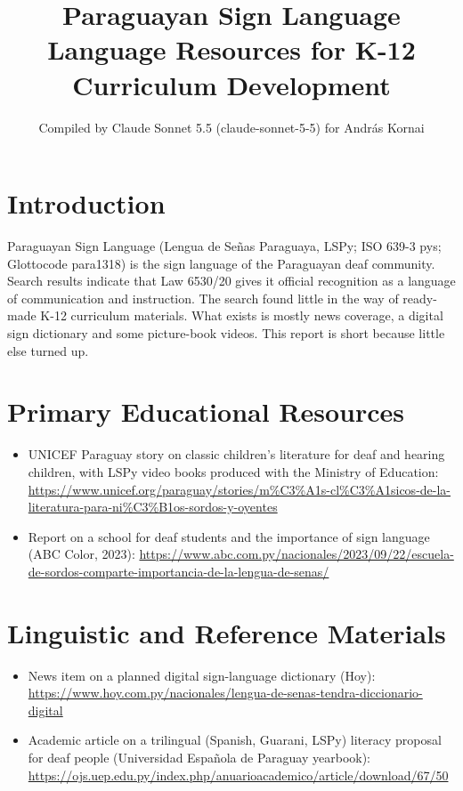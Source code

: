 \documentclass[12pt]{article}
\title{Paraguayan Sign Language Language Resources for K-12 Curriculum Development}
\author{Compiled by Claude Sonnet 5.5 (claude-sonnet-5-5) for Andr\'as Kornai}
\date{}
\begin{document}
\maketitle

\section{Introduction}
Paraguayan Sign Language (Lengua de Se\~nas Paraguaya, LSPy; ISO 639-3 pys; Glottocode para1318) is the sign language of the Paraguayan deaf community. Search results indicate that Law 6530/20 gives it official recognition as a language of communication and instruction. The search found little in the way of ready-made K-12 curriculum materials. What exists is mostly news coverage, a digital sign dictionary and some picture-book videos. This report is short because little else turned up.

\section{Primary Educational Resources}
\begin{itemize}
\item UNICEF Paraguay story on classic children's literature for deaf and hearing children, with LSPy video books produced with the Ministry of Education: \url{https://www.unicef.org/paraguay/stories/m%C3%A1s-cl%C3%A1sicos-de-la-literatura-para-ni%C3%B1os-sordos-y-oyentes}
\item Report on a school for deaf students and the importance of sign language (ABC Color, 2023): \url{https://www.abc.com.py/nacionales/2023/09/22/escuela-de-sordos-comparte-importancia-de-la-lengua-de-senas/}
\end{itemize}

\section{Linguistic and Reference Materials}
\begin{itemize}
\item News item on a planned digital sign-language dictionary (Hoy): \url{https://www.hoy.com.py/nacionales/lengua-de-senas-tendra-diccionario-digital}
\item Academic article on a trilingual (Spanish, Guarani, LSPy) literacy proposal for deaf people (Universidad Espa\~nola de Paraguay yearbook): \url{https://ojs.uep.edu.py/index.php/anuarioacademico/article/download/67/50}
\end{itemize}
\end{document}
